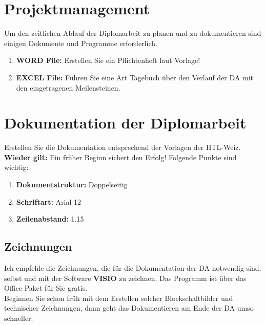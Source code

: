 \documentclass[a4paper, 12pt, xcolor=dvipsnames]{scrartcl}	%
\begin{document}
%
%
%
%
\section{Projektmanagement}
Um den zeitlichen Ablauf der Diplomarbeit zu planen und zu dokumentieren sind einigen Dokumente und Programme erforderlich.
\begin{enumerate}																%
	\item\textbf{WORD File:} Erstellen Sie ein Pflichtenheft laut Vorlage!
	\item\textbf{EXCEL File:} Führen Sie eine Art Tagebuch über den Verlauf der DA mit den eingetragenen Meilensteinen.
\end{enumerate}

\section{Dokumentation der Diplomarbeit}							%
Erstellen Sie die Dokumentation entsprechend der Vorlagen der HTL-Weiz.\\
\textbf{Wieder gilt:} Ein früher Beginn sichert den Erfolg! Folgende Punkte sind wichtig:
\begin{enumerate}																%
	\item\textbf{Dokumentstruktur:} Doppelseitig					%
	\item\textbf{Schriftart:} Arial 12										%
	\item\textbf{Zeilenabstand:} 1.15										%
\end{enumerate}

\vspace{-0.6cm}																	%

\subsection{Zeichnungen}													%
Ich empfehle die Zeichnungen, die für die Dokumentation der DA notwendig sind, selbst und mit der Software \textbf{VISIO} zu zeichnen. Das Programm ist über das Office Paket für Sie gratis.\\
Beginnen Sie schon früh mit dem Erstellen solcher Blockschaltbilder und technischer Zeichnungen, dann geht das Dokumentieren am Ende der DA umso schneller.\\
\vspace{-0.6cm}																	%
\end{document}
